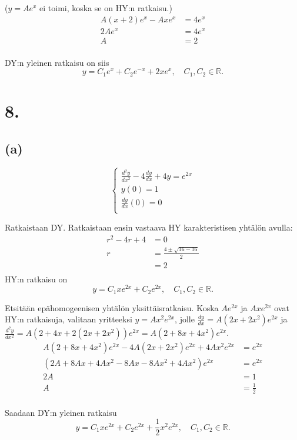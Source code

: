 \documentclass{article}
\begin{document}
($y = Ae^x$ ei toimi, koska se on HY:n ratkaisu.)
\begin{align*}
  A(x + 2)e^x - Axe^x &= 4e^x \\
  2Ae^x &= 4e^x \\
  A &= 2 \\
\end{align*}

DY:n yleinen ratkaisu on siis
\[
  y = C_1e^x + C_2e^{-x} + 2xe^x, \quad C_1,C_2 \in \mathbb{R}.
\]

\section*{8.}

\subsection*{(a)}

\[
  \begin{cases}
    \frac{d^2 y}{d x^2} - 4\frac{dy}{dx} + 4y = e^{2x} \\
    y(0) = 1 \\
    \frac{dy}{dx}(0) = 0 \\
  \end{cases}
\]

Ratkaistaan DY. Ratkaistaan ensin vastaava HY karakteristisen yhtälön
avulla:
\begin{align*}
  r^2 - 4r + 4 &= 0 \\
  r &= \frac{4 \pm \sqrt{16 - 16}}{2} \\
    &= 2 \\
\end{align*}
HY:n ratkaisu on
\[
  y = C_1xe^{2x} + C_2e^{2x}, \quad C_1,C_2 \in \mathbb{R}.
\]

Etsitään epähomogeenisen yhtälön yksittäisratkaisu.
Koska $Ae^{2x}$ ja $Axe^{2x}$ ovat HY:n ratkaisuja, valitaan
yritteeksi $y = Ax^2e^{2x}$, jolle $\frac{dy}{dx} = A(2x + 2x^2)e^{2x}$
ja $\frac{d^2 y}{d x^2} = A(2 + 4x + 2(2x + 2x^2))e^{2x}
= A(2 + 8x + 4x^2)e^{2x}$.
\begin{align*}
  A(2 + 8x + 4x^2)e^{2x} - 4A(2x + 2x^2)e^{2x} + 4Ax^2e^{2x} &= e^{2x} \\
  (2A + 8Ax + 4Ax^2 - 8Ax - 8Ax^2 + 4Ax^2)e^{2x} &= e^{2x} \\
  2A &= 1 \\
  A &= \frac{1}{2} \\
\end{align*}

Saadaan DY:n yleinen ratkaisu
\[
  y = C_1xe^{2x} + C_2e^{2x} + \frac{1}{2}x^2e^{2x}, \quad C_1,C_2 \in \mathbb{R}.
\]
\end{document}
